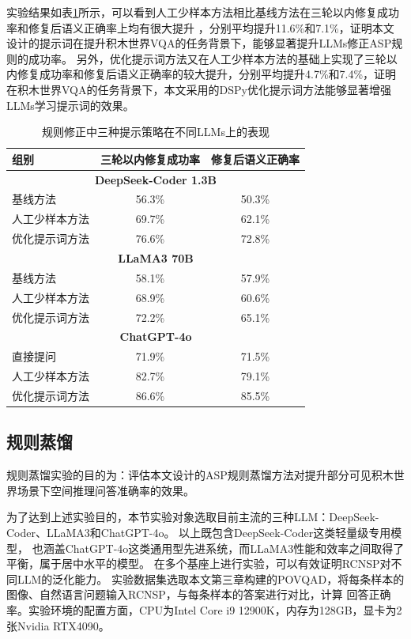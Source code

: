 实验结果如表\ref{tab:rule-fix-result}所示，可以看到人工少样本方法相比基线方法在三轮以内修复成功率和修复后语义正确率上均有很大提升
，分别平均提升11.6\%和7.1\%，证明本文设计的提示词在提升积木世界VQA的任务背景下，能够显著提升LLMs修正ASP规则的成功率。
另外，优化提示词方法又在人工少样本方法的基础上实现了三轮以内修复成功率和修复后语义正确率的较大提升，分别平均提升4.7\%和7.4\%，证明
在积木世界VQA的任务背景下，本文采用的DSPy优化提示词方法能够显著增强LLMs学习提示词的效果。
\begin{table}[h]
    \centering
    \begin{tabular}{lcc}
        \toprule
        \textbf{组别} & \textbf{三轮以内修复成功率} & \textbf{修复后语义正确率}\\
        \midrule
        \multicolumn{3}{c}{\textbf{DeepSeek-Coder 1.3B}} \\
        基线方法 & 56.3\% & 50.3\%\\
        人工少样本方法 & 69.7\% & 62.1\% \\
        优化提示词方法 & 76.6\% & 72.8\% \\
        \midrule
        \multicolumn{3}{c}{\textbf{LLaMA3 70B}} \\
        基线方法 & 58.1\% & 57.9\% \\
        人工少样本方法 & 68.9\% & 60.6\% \\
        优化提示词方法 & 72.2\% & 65.1\% \\
        \midrule
        \multicolumn{3}{c}{\textbf{ChatGPT-4o}} \\
        直接提问 & 71.9\% & 71.5\% \\
        人工少样本方法 & 82.7\% & 79.1\% \\
        优化提示词方法 & 86.6\% & 85.5\% \\
        \bottomrule
    \end{tabular}
    \caption{规则修正中三种提示策略在不同LLMs上的表现}
    \label{tab:rule-fix-result}
\end{table}

\subsection{规则蒸馏}
规则蒸馏实验的目的为：评估本文设计的ASP规则蒸馏方法对提升部分可见积木世界场景下空间推理问答准确率的效果。

为了达到上述实验目的，本节实验对象选取目前主流的三种LLM：DeepSeek-Coder、LLa\-MA3和ChatGPT-4o。
以上既包含DeepSeek-Coder这类轻量级专用模型，
也涵盖ChatGPT-4o这类通用型先进系统，而LLaMA3性能和效率之间取得了平衡，属于居中水平的模型。
在多个基座上进行实验，可以有效证明RCNSP对不同LLM的泛化能力。
实验数据集选取本文第三章构建的POVQAD，将每条样本的图像、自然语言问题输入RCNSP，与每条样本的答案进行对比，计算
回答正确率。实验环境的配置方面，CPU为Intel Core i9 12900K，内存为128GB，显卡为2张Nvidia RTX4090。

